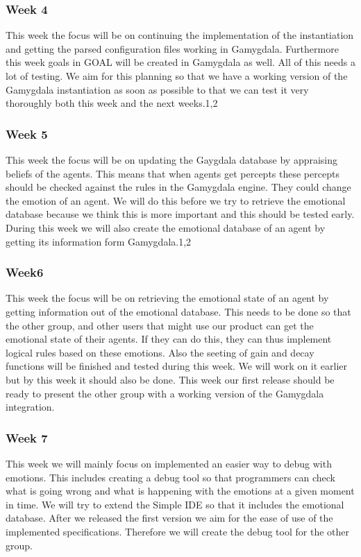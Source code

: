 \documentclass[]{article}
\begin{document}
\subsubsection*{Week 4}
This week the focus will be on continuing the implementation of the instantiation and getting the parsed configuration files working in Gamygdala. Furthermore this week goals in GOAL will be created in Gamygdala as well. All of this needs a lot of testing. We aim for this planning so that we have a working version of the Gamygdala instantiation as soon as possible to that we can test it very thoroughly both this week and the next weeks.1,2

\subsubsection*{Week 5}
This week the focus will be on updating the Gaygdala database by appraising beliefs of the agents. This means that when agents get percepts these percepts should be checked against the rules in the Gamygdala engine. They could change the emotion of an agent. We will do this before we try to retrieve the emotional database because we think this is more important and this should be tested early. During this week we will also create the emotional database of an agent by getting its information form Gamygdala.1,2


\subsubsection*{Week6}
This week the focus will be on retrieving the emotional state of an agent by getting information out of the emotional database. This needs to be done so that the other group, and other users that might use our product can get the emotional state of their agents. If they can do this, they can thus implement logical rules based on these emotions. Also the seeting of gain and decay functions will be finished and tested during this week. We will work on it earlier but by this week it should also be done. This week our first release should be ready to present the other group with a working version of the Gamygdala integration.


\subsubsection*{Week 7}
This week we will mainly focus on implemented an easier way to debug with emotions. This includes creating a debug tool so that programmers can check what is going wrong and what is happening with the emotions at a given moment in time. We will try to extend the Simple IDE \cite{SimpleIDE} so that it includes the emotional database.
After we released the first version we  aim for the ease of use of the implemented specifications. Therefore we will create the debug tool for the other group.
\end{document}
